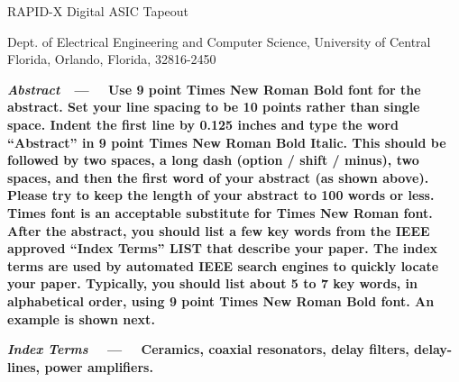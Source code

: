 \documentclass[10pt]{article}
\begin{document}
\begin{multicols}{2}

\begin{center}
    {\fontsize{18pt}{22pt}\selectfont RAPID-X Digital ASIC Tapeout\par}

    \vspace{1em}
    

    \vspace{1em}
    
    {\selectfont Dept. of Electrical Engineering and Computer Science, University of Central Florida, Orlando, Florida, 32816-2450\par}
    
\end{center}

{\fontsize{9pt}{10pt}\selectfont
\setlength{\parindent}{0.125in}
\textbf{\textit{Abstract}\ \ --- \ \ Use 9 point Times New Roman Bold font for the abstract. Set your line spacing to be 10 points rather than single space. Indent the first line by 0.125 inches and type the word “Abstract” in 9 point Times New Roman Bold Italic. This should be followed by two spaces, a long dash (option / shift / minus), two spaces, and then the first word of your abstract (as shown above). Please try to keep the length of your abstract to 100 words or less. Times font is an acceptable substitute for Times New Roman font. After the abstract, you should list a few key words from the IEEE approved “Index Terms” LIST that describe your paper. The index terms are used by automated IEEE search engines to quickly locate your paper. Typically, you should list about 5 to 7 key words, in alphabetical order, using 9 point Times New Roman Bold font. An example is shown next.}

\vspace{0pt}

\textbf{ \textit{Index Terms} \ \ --- \ \ Ceramics, coaxial resonators, delay filters, delay-lines, power amplifiers. }

}


\end{multicols}
\end{document}

